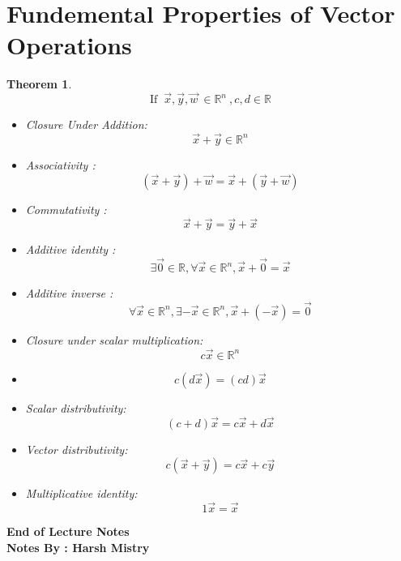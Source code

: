 \documentclass[twoside]{article}
\newcounter{lecnum}
\newtheorem{theorem}{Theorem}[lecnum]
\begin{document}
\section{Fundemental Properties of Vector Operations}
\begin{theorem}
\[\text{If  } \ \vec{x}, \vec{y}, \vec{w}  \ \in \mathbb{R}^n \ , c,d \in \mathbb{R}\]
\begin{itemize}
\item Closure Under Addition: \[\vec{x} + \vec{y} \in \mathbb{R}^n\]
\item Associativity : \[(\vec{x} + \vec{y}) + \vec{w} = \vec{x} + (\vec{y} + \vec{w})\]
\item Commutativity : \[\vec{x} + \vec{y} = \vec{y} + \vec{x}\]
\item Additive identity : \[\exists \vec{0} \in \mathbb{R}, \forall \vec{x} \in \mathbb{R}^n, \vec{x} + \vec{0} = \vec{x}\]
\item Additive inverse : \[\forall \vec{x} \in \mathbb{R}^n, \exists -\vec{x} \in \mathbb{R}^n, \vec{x} + (-\vec{x}) = \vec{0}\]
\item Closure under scalar multiplication: \[c\vec{x} \in \mathbb{R}^n\]
\item \[c(d\vec{x}) = (cd)\vec{x}\]
\item  Scalar distributivity: \[(c + d)\vec{x} = c\vec{x} + d\vec{x}\]
\item Vector distributivity: \[c(\vec{x} + \vec{y}) = c\vec{x} + c\vec{y}\]
\item Multiplicative identity: \[1\vec{x} = \vec{x}\]




\end{itemize}

\end{theorem}
\begin{center}
\textbf{End of Lecture Notes} \\
\textbf{Notes By : Harsh Mistry}
\end{center}
\end{document}
